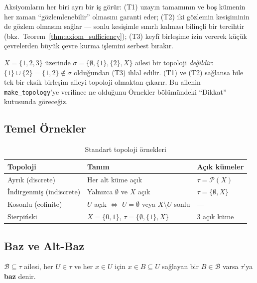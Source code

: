 Aksiyomların her biri ayrı bir iş görür: (T1) uzayın tamamının ve boş
kümenin her zaman ``gözlemlenebilir'' olmasını garanti eder; (T2) iki
gözlemin kesişiminin de gözlem olmasını sağlar --- sonlu kesişimle sınırlı
kalması bilinçli bir tercihtir (bkz.\ Teorem~\ref{thm:axiom_sufficiency});
(T3) keyfî birleşime izin vererek küçük çevrelerden büyük çevre kurma
işlemini serbest bırakır.

\begin{karsiornek}
$X=\{1,2,3\}$ üzerinde $\sigma=\{\emptyset,\{1\},\{2\},X\}$ ailesi bir
topoloji \emph{değildir}: $\{1\}\cup\{2\}=\{1,2\}\notin\sigma$
olduğundan (T3) ihlal edilir. (T1) ve (T2) sağlansa bile tek bir eksik
birleşim aileyi topoloji olmaktan çıkarır. Bu ailenin
\texttt{make\_topology}'ye verilince ne olduğunu Örnekler bölümündeki
``Dikkat'' kutusunda göreceğiz.
\end{karsiornek}

\subsection{Temel Örnekler}

\begin{table}[h]
\centering
\begin{tabular}{lll}
\toprule
\textbf{Topoloji} & \textbf{Tanım} & \textbf{Açık kümeler} \\
\midrule
Ayrık (discrete) & Her alt küme açık & $\tau = \mathcal{P}(X)$ \\
İndirgenmiş (indiscrete) & Yalnızca $\emptyset$ ve $X$ açık & $\tau = \{\emptyset, X\}$ \\
Kosonlu (cofinite) & $U$ açık $\iff$ $U=\emptyset$ veya $X\setminus U$ sonlu & — \\
Sierpiński & $X=\{0,1\}$, $\tau = \{\emptyset, \{1\}, X\}$ & 3 açık küme \\
\bottomrule
\end{tabular}
\caption{Standart topoloji örnekleri}
\end{table}

\subsection{Baz ve Alt-Baz}

\begin{definition}[Baz]
\label{def:basis}
$\mathcal{B} \subseteq \tau$ ailesi, her $U \in \tau$ ve her $x \in U$ için
$x \in B \subseteq U$ sağlayan bir $B \in \mathcal{B}$ varsa $\tau$'ya \textbf{baz} denir.
\end{definition}

